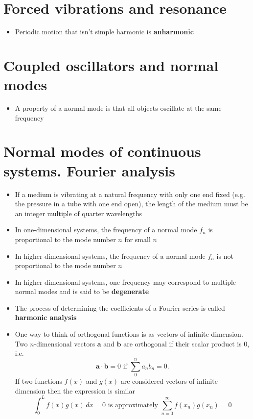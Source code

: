 \documentclass{article}
\begin{document}
\section{Forced vibrations and resonance}

\begin{itemize}
  \item Periodic motion that isn't simple harmonic is \textbf{anharmonic}
\end{itemize}

\section{Coupled oscillators and normal modes}

\begin{itemize}
  \item A property of a normal mode is that all objects oscillate at the same frequency
\end{itemize}

\section{Normal modes of continuous systems. Fourier analysis}

\begin{itemize}
\item If a medium is vibrating at a natural frequency with only one end fixed (e.g. the pressure in a tube with one end open), the length of the medium must be an integer multiple of quarter wavelengths

\item In one-dimensional systems, the frequency of a normal mode $f_n$ is proportional to the mode number $n$ for small $n$

\item In higher-dimensional systems, the frequency of a normal mode $f_n$ is not proportional to the mode number $n$

\item In higher-dimensional systems, one frequency may correspond to multiple normal modes and is said to be \textbf{degenerate}

\item The process of determining the coefficients of a Fourier series is called \textbf{harmonic analysis}

\item One way to think of orthogonal functions is as vectors of infinite dimension. Two $n$-dimensional vectors $\mathbf{a}$ and $\mathbf{b}$ are orthogonal if their scalar product is $0$, i.e. \[\mathbf{a} \cdot \mathbf{b} = 0 \text{ if } \sum_0^n a_n b_n = 0.\] If two functions $f(x)$ and $g(x)$ are considered vectors of infinite dimension then the expression is similar \[\int_0^L f(x) g(x) \,dx = 0 \text{ is approximately } \sum_{n = 0}^\infty f(x_n) g(x_n) = 0\]
\end{itemize}
\end{document}
